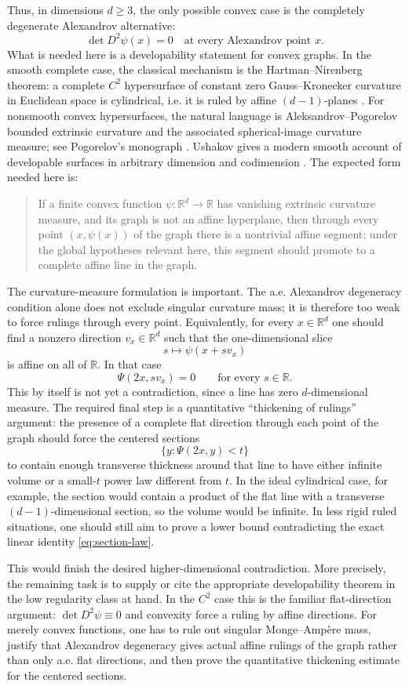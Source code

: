 \documentclass[11pt]{amsart}
\def\R{\mathbb{R}}
\begin{document}
Thus, in dimensions $d\geq 3$, the only possible convex case is the completely
degenerate Alexandrov alternative:
\[
    \det D^2\psi(x)=0
    \quad\text{at every Alexandrov point }x.
\]
What is needed here is a developability statement for convex graphs.  In the
smooth complete case, the classical mechanism is the Hartman--Nirenberg
theorem: a complete $C^2$ hypersurface of constant zero Gauss--Kronecker
curvature in Euclidean space is cylindrical, i.e. it is ruled by affine
$(d-1)$-planes \cite{HN59}.  For nonsmooth convex hypersurfaces, the natural
language is Aleksandrov--Pogorelov bounded extrinsic curvature and the
associated spherical-image curvature measure; see Pogorelov's monograph
\cite{Po73}.  Ushakov gives a modern smooth account of developable surfaces in
arbitrary dimension and codimension \cite{Us99}.  The expected form needed
here is:
\begin{quote}
If a finite convex function $\psi:\R^d\to\R$ has vanishing extrinsic curvature
measure, and its graph is not an affine hyperplane, then through every point
$(x,\psi(x))$ of the graph there is a nontrivial affine segment; under the
global hypotheses relevant here, this segment should promote to a complete
affine line in the graph.
\end{quote}
The curvature-measure formulation is important.  The a.e. Alexandrov
degeneracy condition alone does not exclude singular curvature mass; it is
therefore too weak to force rulings through every point.
Equivalently, for every $x\in\R^d$ one should find a nonzero direction
$v_x\in\R^d$ such that the one-dimensional slice
\[
    s\mapsto \psi(x+sv_x)
\]
is affine on all of $\R$.  In that case
\[
    \Psi(2x,sv_x)=0\qquad\text{for every }s\in\R.
\]
This by itself is not yet a contradiction, since a line has zero
$d$-dimensional measure.  The required final step is a quantitative
``thickening of rulings'' argument: the presence of a complete flat direction
through each point of the graph should force the centered sections
\[
    \{y:\Psi(2x,y)<t\}
\]
to contain enough transverse thickness around that line to have either
infinite volume or a small-$t$ power law different from $t$.  In the ideal
cylindrical case, for example, the section would contain a product of the flat
line with a transverse $(d-1)$-dimensional section, so the volume would be
infinite.  In less rigid ruled situations, one should still aim to prove a
lower bound contradicting the exact linear identity \eqref{eq:section-law}.

This would finish the desired higher-dimensional contradiction.  More
precisely, the remaining task is to supply or cite the appropriate
developability theorem in the low regularity class at hand.  In the $C^2$
case this is the familiar flat-direction argument: $\det D^2\psi\equiv0$ and
convexity force a ruling by affine directions.  For merely convex functions,
one has to rule out singular Monge--Ampère mass, justify that Alexandrov
degeneracy gives actual affine rulings of the graph rather than only a.e. flat
directions, and then prove the quantitative thickening estimate for the
centered sections.
\end{document}

